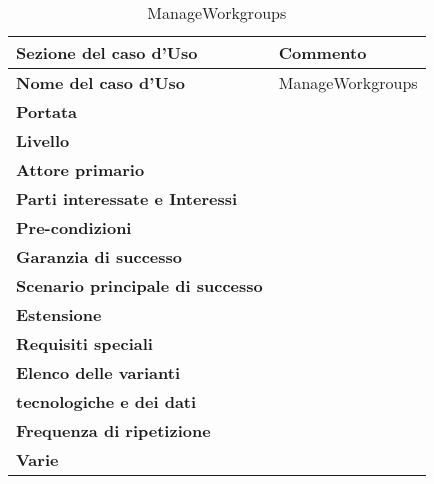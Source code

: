 \documentclass[12pt]{scrartcl}
\begin{document}
\begin{table}[h!]
  \caption{ManageWorkgroups}
  \label{tab:table7}
  \begin{tabular}{|l|l|}
    \toprule
    \textbf{Sezione del caso d'Uso} & \textbf{Commento}\\
    \midrule
    \textbf{Nome del caso d'Uso} & ManageWorkgroups\\
    \midrule
    \textbf{Portata} & \\
    \midrule
    \textbf{Livello} & \\
    \midrule
    \textbf{Attore primario} & \\
    \midrule
    \textbf{Parti interessate e Interessi} & \\
    \midrule
    \textbf{Pre-condizioni} & \\
    \midrule
    \textbf{Garanzia di successo} & \\
    \midrule
    \textbf{Scenario principale di successo} & \\
    \midrule
    \textbf{Estensione} & \\
    \midrule
    \textbf{Requisiti speciali} & \\
    \midrule
    \textbf{Elenco delle varianti}\\ \textbf{tecnologiche e dei dati} & \\
    \midrule
    \textbf{Frequenza di ripetizione} & \\
    \textbf{Varie} & \\
    \bottomrule
  \end{tabular}
\end{table}
\end{document}
